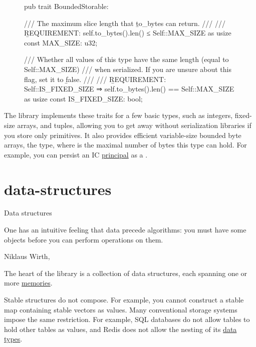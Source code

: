 \documentclass{article}
\begin{document}
\begin{figure}
\begin{code}[rust]
pub trait BoundedStorable: \href{#storable-trait}{} {\label{bounded-storable-trait}
    /// The maximum slice length that \b{to_bytes} can return.
    ///
    /// \b{REQUIREMENT}: self.to_bytes().len() ≤ Self::MAX_SIZE as usize
    const MAX_SIZE: u32;\label{max-size-attribute}

    /// Whether all values of this type have the same length (equal to Self::MAX_SIZE)
    /// when serialized. If you are unsure about this flag, set it to \b{false}.
    ///
    /// \b{REQUIREMENT}: Self::IS_FIXED_SIZE ⇒ self.to_bytes().len() == Self::MAX_SIZE as usize
    const IS_FIXED_SIZE: bool;\label{is-fixed-size-attribute}
}
\end{code}
\end{figure}

The library implements these traits for a few basic types, such as integers, fixed-size arrays, and tuples, allowing you to get away without serialization libraries if you store only primitives.
It also provides efficient variable-size bounded byte arrays, the  type, where  is the maximal number of bytes this type can hold.
For example, you can persist an IC \href{https://internetcomputer.org/docs/current/references/ic-interface-spec#principal}{principal} as a .

\section{data-structures}{Data structures}
\epigraph{
    One has an intuitive feeling that data precede algorithms: you must have some objects before you can perform operations on them.
}{Niklaus Wirth, \cite{Algorithms + Data Structures = Programs, p. xiii}}

The heart of the  library is a collection of data structures, each spanning one or more \href{#memory}{memories}.

Stable structures do not compose.
For example, you cannot construct a stable map containing stable vectors as values.
Many conventional storage systems impose the same restriction.
For example, SQL databases do not allow tables to hold other tables as values, and Redis does not allow the nesting of its \href{https://redis.io/docs/data-types/}{data types}.
\end{document}
